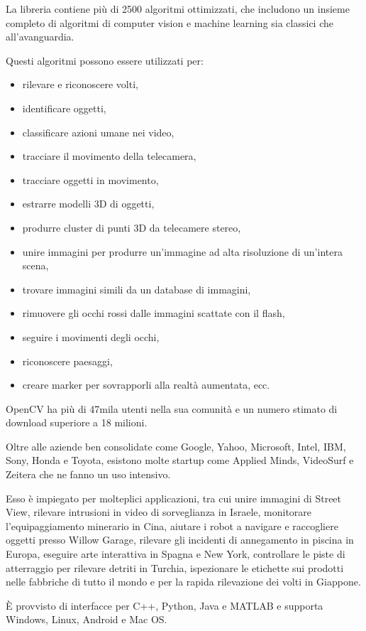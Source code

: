 La libreria contiene più di 2500 algoritmi ottimizzati, che includono un insieme completo di algoritmi di computer vision e machine learning sia classici che all'avanguardia. 

Questi algoritmi possono essere utilizzati per:
\begin{itemize}
  \item rilevare e riconoscere volti, 
  \item identificare oggetti, 
  \item classificare azioni umane nei video, 
  \item tracciare il movimento della telecamera, 
  \item tracciare oggetti in movimento, 
  \item estrarre modelli 3D di oggetti, 
  \item produrre cluster di punti 3D da telecamere stereo, 
  \item unire immagini per produrre un'immagine ad alta risoluzione di un'intera scena, 
  \item trovare immagini simili da un database di immagini, 
  \item rimuovere gli occhi rossi dalle immagini scattate con il flash, 
  \item seguire i movimenti degli occhi, 
  \item riconoscere paesaggi,
  \item creare marker per sovrapporli alla realtà aumentata, ecc. 
\end{itemize}

OpenCV ha più di 47mila utenti nella sua comunità e un numero stimato di download superiore a 18 milioni.

Oltre alle aziende ben consolidate come Google, Yahoo, Microsoft, Intel, IBM, Sony, Honda e Toyota, esistono molte startup come Applied Minds, VideoSurf e Zeitera che ne fanno un uso intensivo. 

Esso è impiegato per molteplici applicazioni, tra cui unire immagini di Street View, rilevare intrusioni in video di sorveglianza in Israele, monitorare l'equipaggiamento minerario in Cina, aiutare i robot a navigare e raccogliere oggetti presso Willow Garage, rilevare gli incidenti di annegamento in piscina in Europa, eseguire arte interattiva in Spagna e New York, controllare le piste di atterraggio per rilevare detriti in Turchia, ispezionare le etichette sui prodotti nelle fabbriche di tutto il mondo e per la rapida rilevazione dei volti in Giappone.

È provvisto di interfacce per C++, Python, Java e MATLAB e supporta Windows, Linux, Android e Mac OS. 

